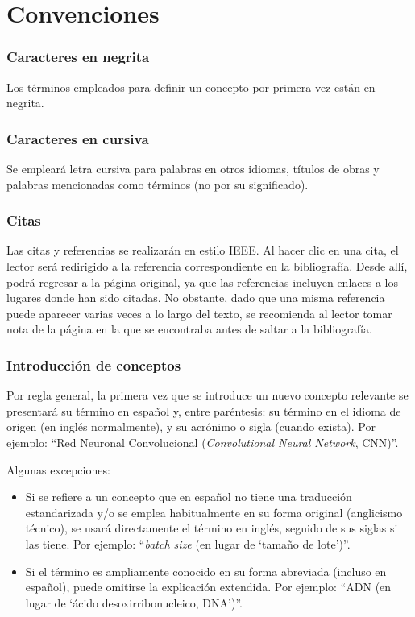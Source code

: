 \chapter*{Convenciones}

\subsection*{Caracteres en negrita}

Los términos empleados para definir un concepto por primera vez están en negrita.


\subsection*{Caracteres en cursiva}

Se empleará letra cursiva para palabras en otros idiomas, títulos de obras y palabras mencionadas como 
términos (no por su significado).


\subsection*{Citas}

Las citas y referencias se realizarán en estilo IEEE.
Al hacer clic en una cita, el lector será redirigido a la referencia correspondiente en la bibliografía. Desde 
allí, podrá regresar a la página original, ya que las referencias incluyen enlaces a los lugares donde han 
sido citadas. No obstante, dado que una misma referencia puede aparecer varias veces a lo largo del texto, se 
recomienda al lector tomar nota de la página en la que se encontraba antes de saltar a la bibliografía.


\subsection*{Introducción de conceptos}

Por regla general, la primera vez que se introduce un nuevo concepto relevante  se presentará su término en 
español y, entre paréntesis: su término en el idioma de origen (en inglés normalmente), y su acrónimo o sigla 
(cuando exista). 
Por ejemplo: ``Red Neuronal Convolucional (\textit{Convolutional Neural Network}, CNN)''.

Algunas excepciones:

\begin{itemize}
    
    \item Si se refiere a un concepto que en español no tiene una traducción estandarizada y/o se emplea 
    habitualmente en su forma original (anglicismo técnico), se usará directamente el término en inglés, 
    seguido de sus siglas si las tiene.
    Por ejemplo: ``\textit{batch size} (en lugar de `tamaño de lote')''.

    \item Si el término es ampliamente conocido en su forma abreviada (incluso en español), puede omitirse la 
    explicación extendida. 
    Por ejemplo: ``ADN (en lugar de `ácido desoxirribonucleico, DNA')''.

\end{itemize}

